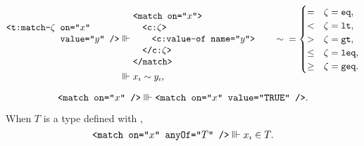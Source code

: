 \begin{axiom}
  \begin{alignat*}{2}
    \begin{aligned}[b]
      \xml{<t:match-$\zeta$ }&\xml{on="$x$"} \xmlnll
                             &\xml{value="$y$" />}
    \end{aligned}
    {}&\equivish{}
    \begin{aligned}
      &\xml{<match on="$x$">} \xmlnll
      &\quad \xml{<c:$\zeta$>} \xmlnll
      &\quad\quad \xml{<c:value-of name="$y$">} \xmlnll
      &\quad \xml{</c:$\zeta$>} \xmlnll
      &\xml{</match>}
    \end{aligned}
    \qquad
    \sim{} = \smash{\begin{cases}
             =    &\zeta=\xml{eq},  \\
             <    &\zeta=\xml{lt},  \\
             >    &\zeta=\xml{gt},  \\
             \leq &\zeta=\xml{leq}, \\
             \geq &\zeta=\xml{geq}.
           \end{cases}} \\
  &\equivish \varsub x \sim \varsub y,
  \end{alignat*}
\end{axiom}

\begin{axiom}
  \begin{equation*}
    \texttt{<match on="$x$" />}
      \Vvdash \texttt{<match on="$x$" value="TRUE" />}.
  \end{equation*}
\end{axiom}

\begin{axiom}
  When $T$ is a type defined with ,
  \begin{equation*}
    \texttt{<match on="$x$" anyOf="$T$" />} \Vvdash {x}_{\imath} \in T.
  \end{equation*}
\end{axiom}

